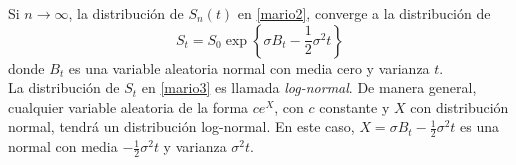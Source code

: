 \documentclass[11pt,notitlepage]{article}
\begin{document}
\begin{teo}
Si $n \rightarrow \infty$, la distribución de $S_n(t)$ en \eqref{mario2}, converge a la distribución de
\begin{equation} \label{mario3}
    S_t = S_0 \exp \left\{ \sigma B_t - \frac{1}{2}\sigma^2t\right\}
\end{equation}
donde $B_t$ es una variable aleatoria normal con media cero y varianza $t$. \\ \linebreak
\textnormal{La distribución de $S_t$ en \eqref{mario3} es llamada \textit{log-normal}. De manera general, cualquier variable aleatoria de la forma $ce^X$, con $c$ constante y $X$ con distribución normal, tendrá un distribución log-normal. En este caso, $X = \sigma B_t - \frac{1}{2}\sigma^2t$ es una normal con media $-\frac{1}{2}\sigma^2t$ y varianza $\sigma^2t$. }
\end{teo}
\end{document}
